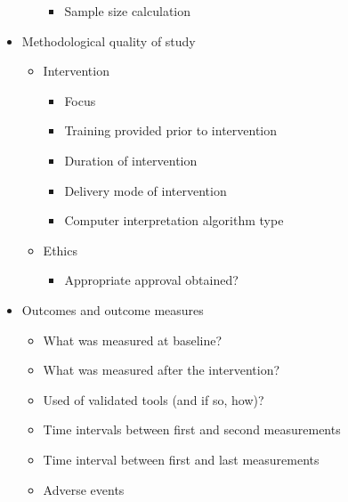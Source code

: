 \begin{itemize}
\begin{itemize}
\begin{itemize}
\item Sample size calculation

\end{itemize}

\end{itemize}

\item Methodological quality of study

\begin{itemize}
\item Intervention

\begin{itemize}
\item Focus

\item Training provided prior to intervention

\item Duration of intervention

\item Delivery mode of intervention

\item Computer interpretation algorithm type

\end{itemize}

\item Ethics

\begin{itemize}
\item Appropriate approval obtained?

\end{itemize}

\end{itemize}

\item Outcomes and outcome measures

\begin{itemize}
\item What was measured at baseline?

\item What was measured after the intervention?

\item Used of validated tools (and if so, how)?

\item Time intervals between first and second measurements

\item Time interval between first and last measurements

\item Adverse events


\end{itemize}
\end{itemize}
